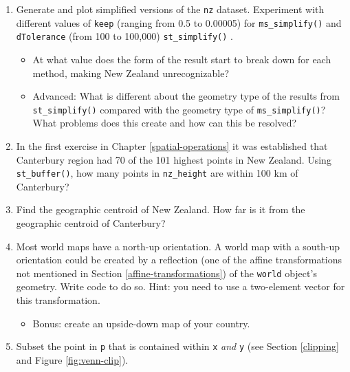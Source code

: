 \documentclass[]{krantz}
\providecommand{\tightlist}{%
  \setlength{\itemsep}{0pt}\setlength{\parskip}{0pt}}
\begin{document}
\begin{enumerate}
\def\labelenumi{\arabic{enumi}.}
\item
  Generate and plot simplified versions of the \texttt{nz} dataset.
  Experiment with different values of \texttt{keep} (ranging from 0.5 to 0.00005) for \texttt{ms\_simplify()} and \texttt{dTolerance} (from 100 to 100,000) \texttt{st\_simplify()} .

  \begin{itemize}
  \tightlist
  \item
    At what value does the form of the result start to break down for each method, making New Zealand unrecognizable?
  \item
    Advanced: What is different about the geometry type of the results from \texttt{st\_simplify()} compared with the geometry type of \texttt{ms\_simplify()}? What problems does this create and how can this be resolved?
  \end{itemize}
\item
  In the first exercise in Chapter \ref{spatial-operations} it was established that Canterbury region had 70 of the 101 highest points in New Zealand.
  Using \texttt{st\_buffer()}, how many points in \texttt{nz\_height} are within 100 km of Canterbury?
\item
  Find the geographic centroid of New Zealand.
  How far is it from the geographic centroid of Canterbury?
\item
  Most world maps have a north-up orientation.
  A world map with a south-up orientation could be created by a reflection (one of the affine transformations not mentioned in Section \ref{affine-transformations}) of the \texttt{world} object's geometry.
  Write code to do so.
  Hint: you need to use a two-element vector for this transformation.

  \begin{itemize}
  \tightlist
  \item
    Bonus: create an upside-down map of your country.
  \end{itemize}
\item
  Subset the point in \texttt{p} that is contained within \texttt{x} \emph{and} \texttt{y} (see Section \ref{clipping} and Figure \ref{fig:venn-clip}).


\end{enumerate}
\end{document}
